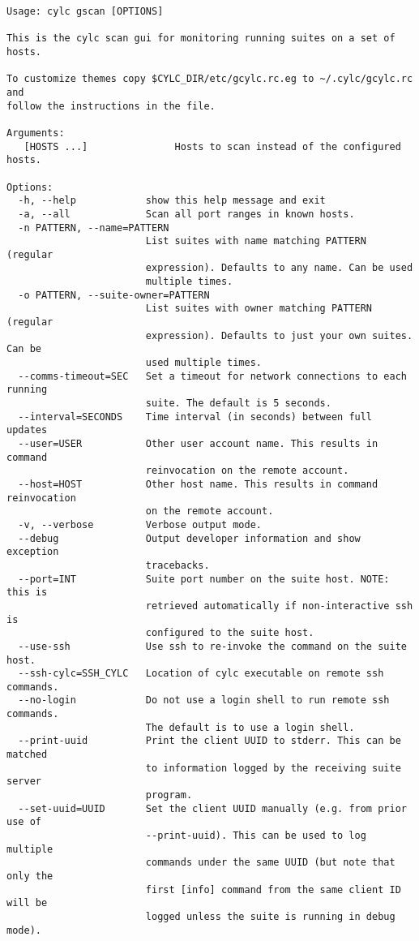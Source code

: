 \begin{lstlisting}
Usage: cylc gscan [OPTIONS]

This is the cylc scan gui for monitoring running suites on a set of
hosts.

To customize themes copy $CYLC_DIR/etc/gcylc.rc.eg to ~/.cylc/gcylc.rc and
follow the instructions in the file.

Arguments:
   [HOSTS ...]               Hosts to scan instead of the configured hosts.

Options:
  -h, --help            show this help message and exit
  -a, --all             Scan all port ranges in known hosts.
  -n PATTERN, --name=PATTERN
                        List suites with name matching PATTERN (regular
                        expression). Defaults to any name. Can be used
                        multiple times.
  -o PATTERN, --suite-owner=PATTERN
                        List suites with owner matching PATTERN (regular
                        expression). Defaults to just your own suites. Can be
                        used multiple times.
  --comms-timeout=SEC   Set a timeout for network connections to each running
                        suite. The default is 5 seconds.
  --interval=SECONDS    Time interval (in seconds) between full updates
  --user=USER           Other user account name. This results in command
                        reinvocation on the remote account.
  --host=HOST           Other host name. This results in command reinvocation
                        on the remote account.
  -v, --verbose         Verbose output mode.
  --debug               Output developer information and show exception
                        tracebacks.
  --port=INT            Suite port number on the suite host. NOTE: this is
                        retrieved automatically if non-interactive ssh is
                        configured to the suite host.
  --use-ssh             Use ssh to re-invoke the command on the suite host.
  --ssh-cylc=SSH_CYLC   Location of cylc executable on remote ssh commands.
  --no-login            Do not use a login shell to run remote ssh commands.
                        The default is to use a login shell.
  --print-uuid          Print the client UUID to stderr. This can be matched
                        to information logged by the receiving suite server
                        program.
  --set-uuid=UUID       Set the client UUID manually (e.g. from prior use of
                        --print-uuid). This can be used to log multiple
                        commands under the same UUID (but note that only the
                        first [info] command from the same client ID will be
                        logged unless the suite is running in debug mode).
\end{lstlisting}
